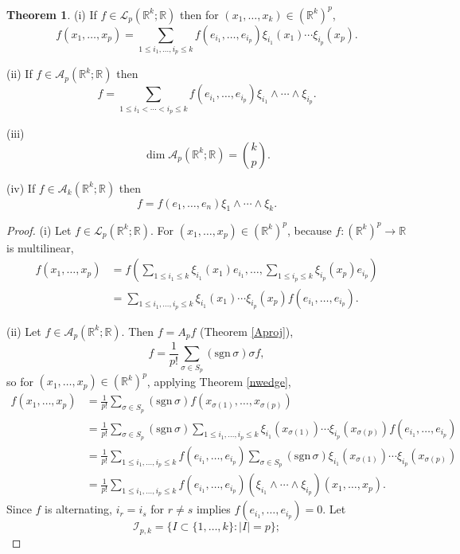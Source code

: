 \documentclass{article}
\newcommand{\sgn}{\mathrm{sgn}\,}
\theoremstyle{definition}
\newtheorem{theorem}{Theorem}
\theoremstyle{definition}
\begin{document}
\begin{theorem}
(i) If $f \in \mathscr{L}_p(\mathbb{R}^k;\mathbb{R})$ then for $(x_1,\ldots,x_k) \in (\mathbb{R}^k)^p$,
\[
f(x_1,\ldots,x_p) =\sum_{1 \leq i_1, \ldots, i_p \leq k} f(e_{i_1}, \ldots,e_{i_p}) \xi_{i_1}(x_1)\cdots \xi_{i_p}(x_p).
\]

(ii) If $f \in \mathscr{A}_p(\mathbb{R}^k;\mathbb{R})$ then
\[
f = \sum_{1 \leq i_1 < \cdots < i_p \leq k} f(e_{i_1}, \ldots,e_{i_p}) \xi_{i_1} \wedge \cdots \wedge \xi_{i_p}.
\]

(iii)
\[
\dim \mathscr{A}_p(\mathbb{R}^k;\mathbb{R}) = \binom{k}{p}.
\]

(iv) If $f \in \mathscr{A}_k(\mathbb{R}^k;\mathbb{R})$ then
\[
f = f(e_1,\ldots,e_n) \xi_1 \wedge \cdots \wedge \xi_k.
\]
\label{increasing}
\end{theorem}
\begin{proof}
(i) Let $f \in \mathscr{L}_p(\mathbb{R}^k;\mathbb{R})$. For $(x_1,\ldots,x_p) \in (\mathbb{R}^k)^p$, because $f:(\mathbb{R}^k)^p \to \mathbb{R}$ is multilinear,
\begin{align*}
f(x_1,\ldots,x_p)&=f\left( \sum_{1 \leq i_1 \leq k} \xi_{i_1}(x_1)e_{i_1},
\ldots,\sum_{1 \leq i_p \leq k} \xi_{i_p}(x_p)e_{i_p}\right)\\
&=\sum_{1 \leq i_1, \ldots, i_p \leq k} \xi_{i_1}(x_1)\cdots \xi_{i_p}(x_p) f(e_{i_1},
\ldots,e_{i_p}).
\end{align*}

(ii) Let $f \in \mathscr{A}_p(\mathbb{R}^k;\mathbb{R})$. Then $f=A_pf$ (Theorem \ref{Aproj}),
\[
f = \frac{1}{p!} \sum_{\sigma \in S_p} (\sgn \sigma) \sigma f,
\]
so for $(x_1,\ldots,x_p) \in (\mathbb{R}^k)^p$, applying Theorem \ref{nwedge},
\begin{align*}
f(x_1,\ldots,x_p) &= \frac{1}{p!} \sum_{\sigma \in S_p} (\sgn \sigma) f(x_{\sigma(1)},\ldots,x_{\sigma(p)})\\
&= \frac{1}{p!} \sum_{\sigma \in S_p} (\sgn \sigma) 
\sum_{1 \leq i_1, \ldots, i_p \leq k} \xi_{i_1}(x_{\sigma(1)})\cdots \xi_{i_p}(x_{\sigma(p)}) f(e_{i_1},\ldots,e_{i_p})\\
&=\frac{1}{p!} \sum_{1 \leq i_1, \ldots, i_p \leq k} f(e_{i_1},\ldots,e_{i_p}) \sum_{\sigma \in S_p} (\sgn \sigma) \xi_{i_1}(x_{\sigma(1)})\cdots \xi_{i_p}(x_{\sigma(p)})\\
&=\frac{1}{p!} \sum_{1 \leq i_1, \ldots, i_p \leq k} f(e_{i_1},\ldots,e_{i_p}) (\xi_{i_1} \wedge \cdots \wedge \xi_{i_p})(x_1,\ldots,x_p).
\end{align*}
Since $f$ is alternating, $i_r = i_s$ for $r \neq s$ implies $f(e_{i_1},\ldots,e_{i_p})=0$. 
Let 
\[
\mathscr{I}_{p,k} = \{I \subset \{1,\ldots,k\}: |I|=p\};
\]


\end{proof}
\end{document}
